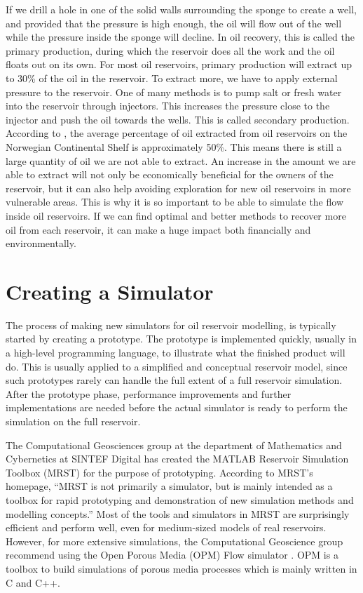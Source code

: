 If we drill a hole in one of the solid walls surrounding the sponge to create a well, and provided that the pressure is high enough, the oil will flow out of the well while the pressure inside the sponge will decline. In oil recovery, this is called the primary production, during which the reservoir does all the work and the oil floats out on its own. For most oil reservoirs, primary production will extract up to 30\% of the oil in the reservoir. To extract more, we have to apply external pressure to the reservoir. One of many methods is to pump salt or fresh water into the reservoir through injectors. This increases the pressure close to the injector and push the oil towards the wells. This is called secondary production. According to \citep{lieMrstUrl}, the average percentage of oil extracted from oil reservoirs on the Norwegian Continental Shelf is approximately 50\%. This means there is still a large quantity of oil we are not able to extract. An increase in the amount we are able to extract will not only be economically beneficial for the owners of the reservoir, but it can also help avoiding exploration for new oil reservoirs in more vulnerable areas. This is why it is so important to be able to simulate the flow inside oil reservoirs. If we can find optimal and better methods to recover more oil from each reservoir, it can make a huge impact both financially and environmentally.

\section{Creating a Simulator}
The process of making new simulators for oil reservoir modelling, is typically started by creating a prototype. The prototype is implemented quickly, usually in a high-level programming language, to illustrate what the finished product will do. This is usually applied to a simplified and conceptual reservoir model, since such prototypes rarely can handle the full extent of a full reservoir simulation. After the prototype phase, performance improvements and further implementations are needed before the actual simulator is ready to perform the simulation on the full reservoir. 

The Computational Geosciences group at the department of Mathematics and Cybernetics at SINTEF Digital has created the MATLAB Reservoir Simulation Toolbox (MRST) \emph{\citep{mrstHomepage}} for the  purpose of prototyping. According to MRST's homepage, \enquote{MRST is not primarily a simulator, but is mainly intended as a toolbox for rapid prototyping and demonstration of new simulation methods and modelling concepts.} Most of the tools and simulators in MRST are surprisingly efficient and perform well, even for medium-sized models of real reservoirs. However, for more extensive simulations, the Computational Geoscience group recommend using the Open Porous Media (OPM) Flow simulator \emph{\citep{opm}}. OPM is a toolbox to build simulations of porous media processes which is mainly written in C and C++. 

